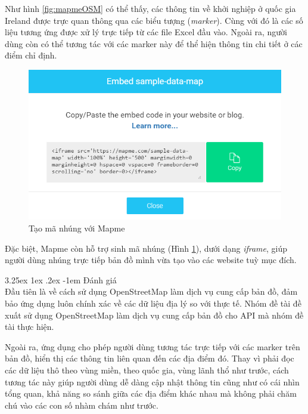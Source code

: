 \documentclass[12pt,a4paper]{article}
\makeatletter
\newcommand{\myparagraph}[1]{\paragraph{#1}\mbox{}\\} %
\renewcommand\paragraph{\@startsection{paragraph}{5}{\z@}%
  {3.25ex \@plus1ex \@minus.2ex}%
  {-1em}%
  {\normalfont\normalsize\bfseries}}
\makeatother
\begin{document}
Như hình \ref{fig:mapmeOSM} có thể thấy, các thông tin về khởi nghiệp ở quốc gia Ireland được trực quan thông qua các biểu tượng (\textit{marker}). Cùng với đó là các số liệu tương ứng được xử lý trực tiếp từ các file Excel đầu vào.
Ngoài ra, người dùng còn có thể tương tác với các marker này để thể hiện thông tin chi tiết ở các điểm chỉ định.

\begin{figure}[!h]
	\begin{center}
    \includegraphics[scale=.8]{image/mapmeExport}
    \caption{Tạo mã nhúng với Mapme}
    \label{fig:mapmeExport}
	\end{center}
\end{figure}

Đặc biệt, Mapme còn hỗ trợ sinh mã nhúng (Hình \ref{fig:mapmeExport}), dưới dạng \textit{iframe}, giúp người dùng nhúng trực tiếp bản đồ mình vừa tạo vào các website tuỳ mục đích.

\myparagraph{Đánh giá}
Đầu tiên là về cách sử dụng OpenStreetMap làm dịch vụ cung cấp bản đồ, đảm bảo ứng dụng luôn chính xác về các dữ liệu địa lý so với thực tế. Nhóm đề tài đề xuất sử dụng OpenStreetMap làm dịch vụ cung cấp bản đồ cho API mà nhóm đề tài thực hiện.

Ngoài ra, ứng dụng cho phép người dùng tương tác trực tiếp với các marker trên bản đồ, hiển thị các thông tin liên quan đến các địa điểm đó. Thay vì phải đọc các dữ liệu thô theo vùng miền, theo quốc gia, vùng lãnh thổ như trước, cách tương tác này giúp người dùng dễ dàng cập nhật thông tin cũng như có cái nhìn tổng quan, khả năng so sánh giữa các địa điểm khác nhau mà không phải chăm chú vào các con số nhàm chám như trước.
\end{document}
